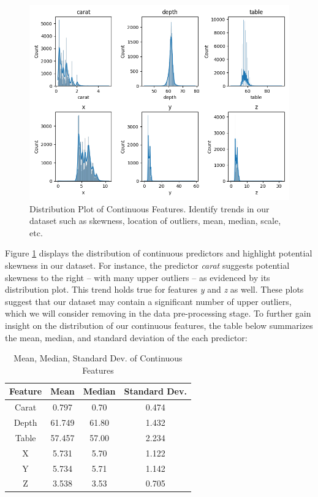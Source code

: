 \documentclass[conference]{IEEEtran}
\begin{document}
\begin{figure}[H]
    \centering
    \includegraphics[width=0.60\linewidth]{distribution_plots.png}
    \caption{Distribution Plot of Continuous Features. Identify trends in our dataset such as skewness, location of outliers, mean, median, scale, etc.}
    \label{fig:distribution}
\end{figure}

Figure \ref{fig:distribution} displays the distribution of continuous predictors and highlight potential skewness in our dataset. For instance, the predictor \emph{carat} suggests potential skewness to the right – with many upper outliers – as evidenced by its distribution plot. This trend holds true for features \emph{y} and \emph{z} as well. These plots suggest that our dataset may contain a significant number of upper outliers, which we will consider removing in the data pre-processing stage. To further gain insight on the distribution of our continuous features, the table below summarizes the mean, median, and standard deviation of the each predictor:

\begin{table}[H]
    \centering
    \caption{Mean, Median, Standard Dev. of Continuous Features}
    \label{tab:example_table}
    \begin{tabular}{|c|c|c|c|}
        \hline
        Feature & Mean & Median & Standard Dev. \\
        \hline
        Carat & 0.797 & 0.70 & 0.474 \\
        \hline
        Depth & 61.749 & 61.80  & 1.432 \\
        \hline
        Table & 57.457 & 57.00 & 2.234 \\
        \hline
        X & 5.731 & 5.70 & 1.122 \\
        \hline
        Y & 5.734 & 5.71 & 1.142 \\
        \hline
        Z & 3.538 & 3.53 & 0.705 \\
        \hline
    \end{tabular}
\end{table}
\end{document}
